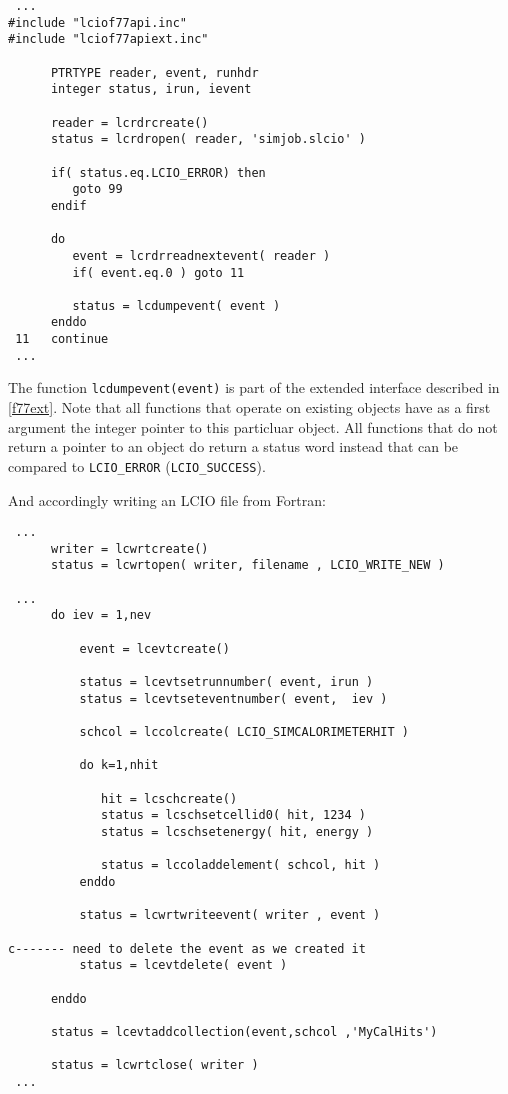 \begin{verbatim}
 ...
#include "lciof77api.inc"
#include "lciof77apiext.inc"

      PTRTYPE reader, event, runhdr
      integer status, irun, ievent

      reader = lcrdrcreate()
      status = lcrdropen( reader, 'simjob.slcio' )
      
      if( status.eq.LCIO_ERROR) then
         goto 99
      endif

      do 
         event = lcrdrreadnextevent( reader )
         if( event.eq.0 ) goto 11 
         
         status = lcdumpevent( event )
      enddo
 11   continue
 ...
\end{verbatim}
The function \verb$lcdumpevent(event)$ is part of the extended interface described in \ref{f77ext}.
Note that all functions that operate on existing objects have as a first argument the integer pointer 
to this particluar object.
All functions that do not return a pointer to an object do return a status word instead that can be 
compared to \verb$LCIO_ERROR$ (\verb$LCIO_SUCCESS$).

And accordingly writing an LCIO file from Fortran:

\begin{verbatim}
 ...
      writer = lcwrtcreate()
      status = lcwrtopen( writer, filename , LCIO_WRITE_NEW )

 ... 
      do iev = 1,nev
          
          event = lcevtcreate()

          status = lcevtsetrunnumber( event, irun ) 
          status = lcevtseteventnumber( event,  iev ) 
 
          schcol = lccolcreate( LCIO_SIMCALORIMETERHIT )

          do k=1,nhit

             hit = lcschcreate() 
             status = lcschsetcellid0( hit, 1234 ) 
             status = lcschsetenergy( hit, energy )

             status = lccoladdelement( schcol, hit ) 
          enddo

          status = lcwrtwriteevent( writer , event )
          
c------- need to delete the event as we created it
          status = lcevtdelete( event )

      enddo

      status = lcevtaddcollection(event,schcol ,'MyCalHits') 

      status = lcwrtclose( writer ) 
 ...
\end{verbatim}

